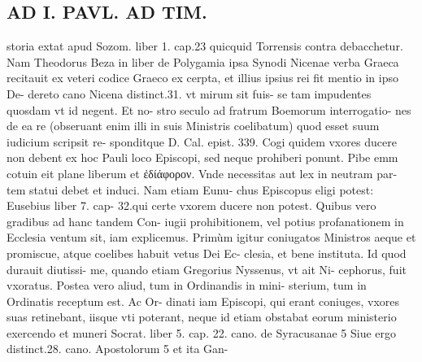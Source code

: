 \documentclass{article}
\begin{document}
\begin{pages}
\section*{AD I. PAVL. AD TIM. }
\marginpar{[ p.112 ]}\pstart storia extat apud Sozom. liber  1. cap.23 quicquid Torrensis contra debacchetur. Nam Theodorus Beza in liber  de Polygamia ipsa Synodi Nicenae verba Graeca recitauit ex veteri codice Graeco ex cerpta, et illius ipsius rei fit mentio in ipso De- dereto cano Nicena distinct.31. vt mirum sit fuis- se tam impudentes quosdam vt id negent. Et no- stro seculo ad fratrum Boemorum interrogatio- nes de ea re (obseruant enim illi in suis Ministris coelibatum) quod esset suum iudicium scripsit re- sponditque D. Cal. epist. 339.  \pend\pstart Cogi quidem vxores ducere non debent ex hoc Pauli loco Episcopi, sed neque prohiberi ponunt. Pibe emm cotuin eit plane liberum et ἐδίάφορον. Vnde necessitas aut lex in neutram par- tem statui debet et induci. Nam etiam Eunu- chus Episcopus eligi potest: Eusebius liber  7. cap- 32.qui certe vxorem ducere non potest.  \pend\pstart Quibus vero gradibus ad hanc tandem Con- iugii prohibitionem, vel potius profanationem in Ecclesia ventum sit, iam explicemus.  \pend\pstart Primùm igitur coniugatos Ministros aeque et promiscue, atque coelibes habuit vetus Dei Ec- clesia, et bene instituta. Id quod durauit diutissi- me, quando etiam Gregorius Nyssenus, vt ait Ni- cephorus, fuit vxoratus.  \pend\pstart Postea vero aliud, tum in Ordinandis in mini- sterium, tum in Ordinatis receptum est. Ac Or- dinati iam Episcopi, qui erant coniuges, vxores suas retinebant, iisque vti poterant, neque id etiam obstabat eorum ministerio exercendo et muneri Socrat. liber 5. cap. 22. cano. de Syracusanae 5 Siue ergo distinct.28. cano. Apostolorum 5 et ita Gan-  \pend

\end{pages}
\end{document}
